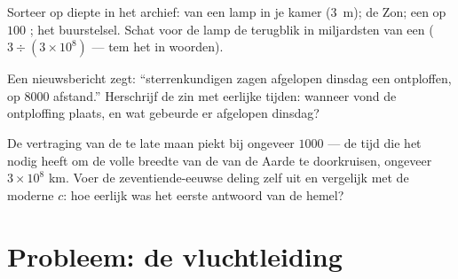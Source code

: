 \begin{exercise}[$\star\star$]\label{exo:g8:speed-of-light:10}
Sorteer op diepte in het archief:  van een lamp in je kamer
(\qty{3}{m}); de Zon; een  op $100$
; het buurstelsel. Schat voor de lamp de terugblik in
miljardsten van een  ($3 \div (3 \times 10^{8})$ --- tem het in
woorden).
\end{exercise}

\begin{exercise}[$\star\star$]\label{exo:g8:speed-of-light:11}
Een nieuwsbericht zegt: ``sterrenkundigen zagen afgelopen dinsdag een
 ontploffen, op $8000$  afstand.''
Herschrijf de zin met eerlijke tijden: wanneer vond de ontploffing
plaats, en wat gebeurde er afgelopen dinsdag?
\end{exercise}

\begin{exercise}[$\star\star\star$]\label{exo:g8:speed-of-light:12}
De vertraging van de te late maan piekt bij ongeveer $1000$ 
--- de tijd die het  nodig heeft om de volle breedte van de
 van de Aarde te doorkruisen, ongeveer $3 \times
10^{8}$ km. Voer de zeventiende-eeuwse deling zelf uit en vergelijk met
de moderne $c$: hoe eerlijk was het eerste antwoord van de hemel?
\end{exercise}

\section{Probleem: de vluchtleiding}

